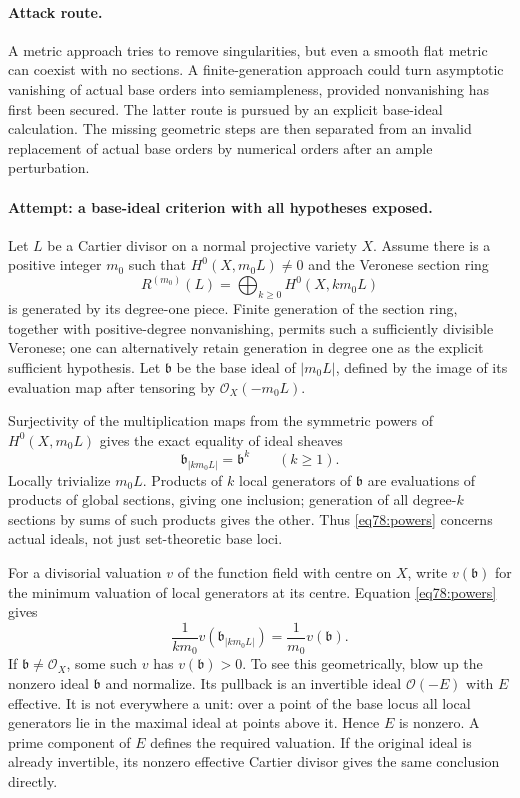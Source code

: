 \documentclass[11pt,a4paper]{article}
\numberwithin{equation}{section}
\begin{document}
\paragraph{Attack route.}
A metric approach tries to remove singularities, but even a smooth flat
metric can coexist with no sections. A finite-generation approach could
turn asymptotic vanishing of actual base orders into semiampleness, provided
nonvanishing has first been secured. The latter route is pursued by an
explicit base-ideal calculation. The missing geometric steps are then
separated from an invalid replacement of actual base orders by numerical
orders after an ample perturbation.

\paragraph{Attempt: a base-ideal criterion with all hypotheses exposed.}
Let $L$ be a Cartier divisor on a normal projective variety $X$. Assume
there is a positive integer $m_0$ such that
$H^0(X,m_0L)\ne0$ and the Veronese section ring
\[
 R^{(m_0)}(L)=\bigoplus_{k\geq0}H^0(X,km_0L)
\]
is generated by its degree-one piece. Finite generation of the section
ring, together with positive-degree nonvanishing, permits such a sufficiently
divisible Veronese; one can alternatively retain generation in degree one
as the explicit sufficient hypothesis. Let $\mathfrak b$ be the base
ideal of $|m_0L|$, defined by the image of its evaluation map after tensoring
by $\mathcal O_X(-m_0L)$.

Surjectivity of the multiplication maps from the symmetric powers of
$H^0(X,m_0L)$ gives the exact equality of ideal sheaves
\begin{equation}\label{eq78:powers}
 \mathfrak b_{|km_0L|}=\mathfrak b^k\qquad(k\geq1).
\end{equation}
Locally trivialize $m_0L$. Products of $k$ local generators of
$\mathfrak b$ are evaluations of products of global sections, giving one
inclusion; generation of all degree-$k$ sections by sums of such products
gives the other. Thus \eqref{eq78:powers} concerns actual ideals, not just
set-theoretic base loci.

For a divisorial valuation $v$ of the function field with centre on $X$,
write $v(\mathfrak b)$ for the minimum valuation of local generators at
its centre. Equation \eqref{eq78:powers} gives
\begin{equation}\label{eq78:order}
 \frac{1}{km_0}v(\mathfrak b_{|km_0L|})
       =\frac1{m_0}v(\mathfrak b).
\end{equation}
If $\mathfrak b\ne\mathcal O_X$, some such $v$ has
$v(\mathfrak b)>0$. To see this geometrically, blow up the nonzero ideal
$\mathfrak b$ and normalize. Its pullback is an invertible ideal
$\mathcal O(-E)$ with $E$ effective. It is not everywhere a unit: over a
point of the base locus all local generators lie in the maximal ideal at
points above it. Hence $E$ is nonzero. A prime component of $E$ defines
the required valuation. If the original ideal is already invertible, its
nonzero effective Cartier divisor gives the same conclusion directly.
\end{document}
